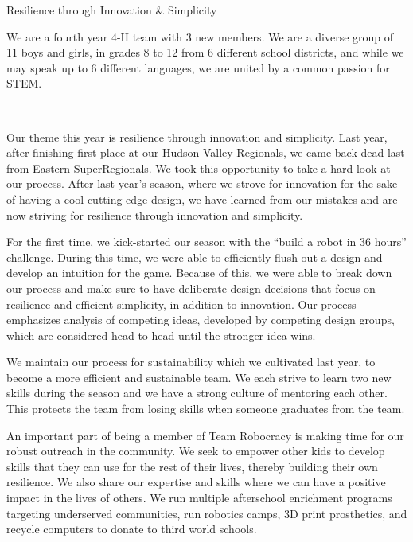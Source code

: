 \begin{TeamStory}{Resilience through Innovation \& Simplicity}

We are a fourth year 4-H team with 3 new members. We are a diverse
group of 11 boys and girls, in grades 8 to 12 from 6 different school
districts, and while we may speak up to 6 different languages, we are
united by a common passion for STEM.\\ \vspace{3mm}

 \\ \vspace{3mm}

Our theme this year is resilience through innovation and
simplicity. Last year, after finishing first place at our Hudson
Valley Regionals, we came back dead last from Eastern
SuperRegionals. We took this opportunity to take a hard look at our
process. After last year’s season, where we strove for innovation for
the sake of having a cool cutting-edge design, we have learned from
our mistakes and are now striving for resilience through innovation
and simplicity.

For the first time, we kick-started our season with the “build a robot
in 36 hours” challenge. During this time, we were able to efficiently
flush out a design and develop an intuition for the game. Because of
this, we were able to break down our process and make sure to have
deliberate design decisions that focus on resilience and efficient
simplicity, in addition to innovation. Our process emphasizes analysis
of competing ideas, developed by competing design groups, which are
considered head to head until the stronger idea wins.

We maintain our process for sustainability which we cultivated last
year, to become a more efficient and sustainable team.  We each strive
to learn two new skills during the season and we have a strong culture
of mentoring each other. This protects the team from losing skills
when someone graduates from the team.

An important part of being a member of Team Robocracy is making time
for our robust outreach in the community. We seek to empower other
kids to develop skills that they can use for the rest of their lives,
thereby building their own resilience. We also share our expertise and
skills where we can have a positive impact in the lives of others. We
run multiple afterschool enrichment programs targeting underserved
communities, run robotics camps, 3D print prosthetics, and recycle
computers to donate to third world schools.


\end{TeamStory}
